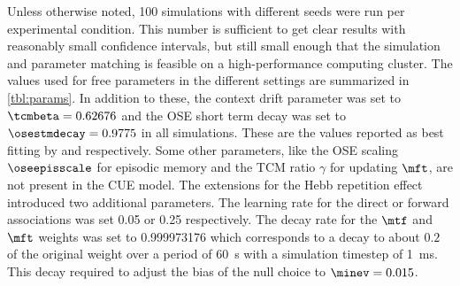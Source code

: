 Unless otherwise noted, 100 simulations with different seeds were run per experimental condition.
This number is sufficient to get clear results with reasonably small confidence intervals, but still small enough that the simulation and parameter matching is feasible on a high-performance computing cluster.
The values used for free parameters in the different settings are summarized in \cref{tbl:params}.
In addition to these, the context drift parameter was set to $\tcmbeta = 0.62676$ and the OSE short term decay was set to $\osestmdecay = 0.9775$ in all simulations.
These are the values reported as best fitting by \textcite{Sederberg2008} and \textcite{Choo2010} respectively.
Some other parameters, like the OSE scaling $\oseepisscale$ for episodic memory and the TCM ratio $\gamma$ for updating $\mft$, are not present in the CUE model.
The extensions for the Hebb repetition effect introduced two additional parameters.
The learning rate for the direct or forward associations was set \num{0.05} or \num{0.25} respectively.
The decay rate for the $\mtf$ and $\mft$ weights was set to \num{0.999973176} which corresponds to a decay to about $0.2$ of the original weight over a period of \SI{60}{\second} with a simulation timestep of \SI{1}{\milli\second}.
This decay required to adjust the bias of the null choice to $\minev = 0.015$.
